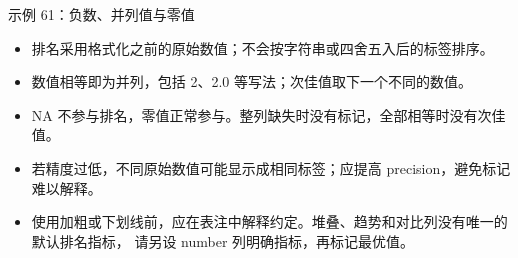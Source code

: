 \begin{example}[text and listing,sidebyside=false]{示例 61：负数、并列值与零值}
\begin{center}
\begin{gradtable}[align=c,header align=c,rules=grid,text width=34mm,column sep=8pt,row padding=2pt]
\end{gradtable}
\end{center}
\end{example}
\begin{itemize}
  \item 排名采用格式化之前的原始数值；不会按字符串或四舍五入后的标签排序。
  \item 数值相等即为并列，包括 2、2.0 等写法；次佳值取下一个不同的数值。
  \item NA 不参与排名，零值正常参与。整列缺失时没有标记，全部相等时没有次佳值。
  \item 若精度过低，不同原始数值可能显示成相同标签；应提高 precision，避免标记难以解释。
  \item 使用加粗或下划线前，应在表注中解释约定。堆叠、趋势和对比列没有唯一的默认排名指标，
        请另设 number 列明确指标，再标记最优值。
\end{itemize}



